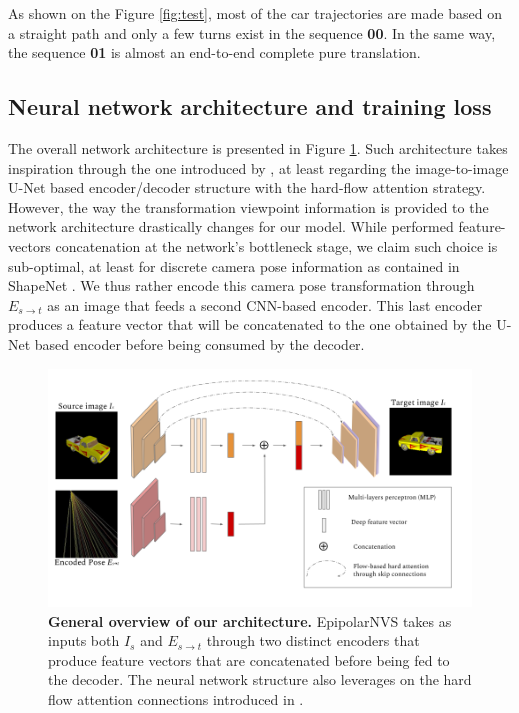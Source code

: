   


As shown on the Figure \ref{fig:test}, most of the car trajectories are made based on a straight path and only a few turns exist in the sequence \textbf{00}. In the same way, the sequence \textbf{01} is almost an end-to-end complete pure translation.


\subsection{Neural network architecture and training loss}

The overall network architecture is presented in Figure \ref{fig:architecture}. Such architecture takes inspiration through the one introduced by \citep{kim2020novel}, at least regarding the image-to-image U-Net based encoder/decoder structure with the hard-flow attention strategy. However, the way the transformation viewpoint information is provided to the network architecture drastically changes for our model. While \citep{kim2020novel} performed feature-vectors concatenation at the network's bottleneck stage, we claim such choice is sub-optimal, at least for discrete camera pose information as contained in ShapeNet \citep{chang2015shapenet}. We thus rather encode this camera pose transformation through $E_{s\xrightarrow{}t}$ as an image that feeds a second CNN-based encoder. This last encoder produces a feature vector that will be concatenated to the one obtained by the U-Net based encoder before being consumed by the decoder. 

\begin{figure}[h!]
  \begin{center}
  \includegraphics[width=\textwidth]{images/epipolarnvs/NetworkArchitecture.png}
  \end{center}
  \caption{\textbf{General overview of our architecture.} EpipolarNVS takes as inputs both $I_s$ and $E_{s\xrightarrow{}t}$ through two distinct encoders that produce feature vectors that are concatenated before being fed to the decoder. The neural network structure also leverages on the hard flow attention connections introduced in \citep{kim2020novel}.}
  \label{fig:architecture}
\end{figure}

